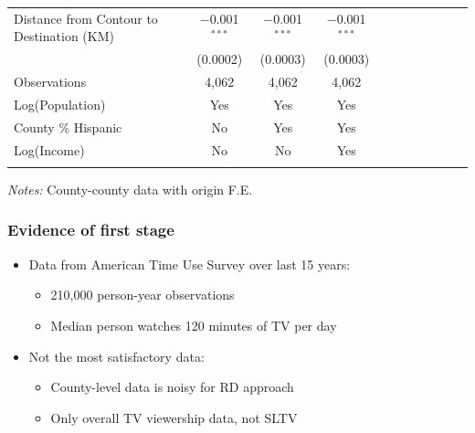 \documentclass{beamer}
\begin{document}
\begin{frame}
\begin{center}
{\begin{threeparttable}
\begin{tabular}{lcccccccccc}
 Distance from Contour to Destination (KM) & $-$0.001$^{***}$ & $-$0.001$^{***}$ & $-$0.001$^{***}$ \\ 
  & (0.0002) & (0.0003) & (0.0003) \\ 
Observations & 4,062 & 4,062 & 4,062 \\         
\hline\addlinespace
                                Log(Population) & Yes & Yes  & Yes\\
                                County \% Hispanic & No & Yes & Yes\\
                                Log(Income) & No & No & Yes\\
				\addlinespace\hline\hline
			\end{tabular}
			\begin{tablenotes}[flushleft]
				\item \textit{Notes:} County-county data with origin F.E. 
			\end{tablenotes}
		\end{threeparttable}

        }
\end{center}
\end{frame}


\begin{frame}
\frametitle{Evidence of first stage}

\begin{itemize}

\item Data from American Time Use Survey over last 15 years:
\begin{itemize}
\item 210,000 person-year observations
\item Median person watches 120 minutes of TV per day
\end{itemize}

\vspace{10pt}
\item Not the most satisfactory data:
\begin{itemize}
\item County-level data is noisy for RD approach
\item Only overall TV viewership data, not SLTV
\end{itemize}

\end{itemize}

\end{frame}
\end{document}
